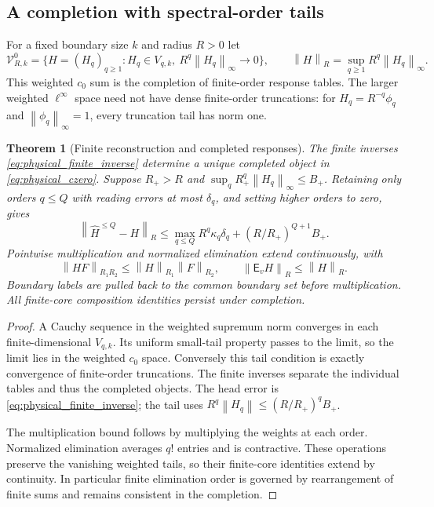 \documentclass[11pt,a4paper]{amsart}
\numberwithin{equation}{section}
\newtheorem{theorem}{Theorem}[section]
\theoremstyle{definition}
\theoremstyle{remark}
\newcommand{\norm}[1]{\left\lVert#1\right\rVert}
\begin{document}
\subsection{A completion with spectral-order tails}
For a fixed boundary size $k$ and radius $R>0$ let
\begin{equation}\label{eq:physical_czero}
 \mathscr V^0_{R,k}=\{H=(H_q)_{q\ge1}:H_q\in V_{q,k},\
                       R^q\norm{H_q}_\infty\to0\},\qquad
 \norm H_R=\sup_{q\ge1}R^q\norm{H_q}_\infty.
\end{equation}
This weighted $c_0$ sum is the completion of finite-order response tables. The larger weighted $\ell^\infty$ space need not have dense finite-order truncations: for $H_q=R^{-q}\phi_q$ and $\norm{\phi_q}_\infty=1$, every truncation tail has norm one.

\begin{theorem}[Finite reconstruction and completed responses]\label{thm:physicalcompletion}
The finite inverses \eqref{eq:physical_finite_inverse} determine a unique completed object in \eqref{eq:physical_czero}. Suppose $R_+>R$ and
$\sup_qR_+^q\norm{H_q}_\infty\le B_+$.
Retaining only orders $q\le Q$ with reading errors at most $\delta_q$, and setting higher orders to zero, gives
\begin{equation}\label{eq:physical_full_error}
 \norm{\widehat H^{\le Q}-H}_R
 \le\max_{q\le Q}R^q\kappa_q\delta_q+(R/R_+)^{Q+1}B_+.
\end{equation}
Pointwise multiplication and normalized elimination extend continuously, with
\begin{equation}\label{eq:physical_radius_ops}
 \norm{HF}_{R_1R_2}\le\norm H_{R_1}\norm F_{R_2},\qquad
 \norm{\mathsf E_vH}_R\le\norm H_R.
\end{equation}
Boundary labels are pulled back to the common boundary set before multiplication. All finite-core composition identities persist under completion.
\end{theorem}
\begin{proof}
A Cauchy sequence in the weighted supremum norm converges in each finite-dimensional $V_{q,k}$. Its uniform small-tail property passes to the limit, so the limit lies in the weighted $c_0$ space. Conversely this tail condition is exactly convergence of finite-order truncations. The finite inverses separate the individual tables and thus the completed objects. The head error is \eqref{eq:physical_finite_inverse}; the tail uses
$R^q\norm{H_q}\le(R/R_+)^qB_+$.

The multiplication bound follows by multiplying the weights at each order. Normalized elimination averages $q!$ entries and is contractive. These operations preserve the vanishing weighted tails, so their finite-core identities extend by continuity. In particular finite elimination order is governed by rearrangement of finite sums and remains consistent in the completion.
\end{proof}
\end{document}

